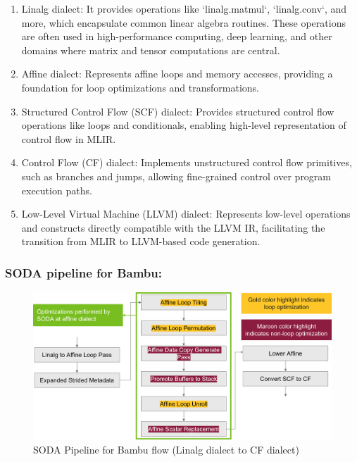 \begin{enumerate}
    
    \item Linalg dialect: It provides operations like `linalg.matmul`, `linalg.conv`, and more, which encapsulate common linear algebra routines. These operations are often used in high-performance computing, deep learning, and other domains where matrix and tensor computations are central.

    \item Affine dialect: Represents affine loops and memory accesses, providing a foundation for loop optimizations and transformations.

    \item Structured Control Flow (SCF) dialect: Provides structured control flow operations like loops and conditionals, enabling high-level representation of control flow in MLIR.

    \item Control Flow (CF) dialect: Implements unstructured control flow primitives, such as branches and jumps, allowing fine-grained control over program execution paths.
    
    \item Low-Level Virtual Machine (LLVM) dialect: Represents low-level operations and constructs directly compatible with the LLVM IR, facilitating the transition from MLIR to LLVM-based code generation.
    
\end{enumerate}

\subsubsection{SODA pipeline for Bambu:}

\begin{figure}[H]
    \centering
    \includegraphics[width=1\linewidth]{figure//chapter1_intro/Fig 3 - Pipeline for Bambu.png}
    \caption{SODA Pipeline for Bambu flow (Linalg dialect to CF dialect)}
    \label{fig:1.3)}
\end{figure}

